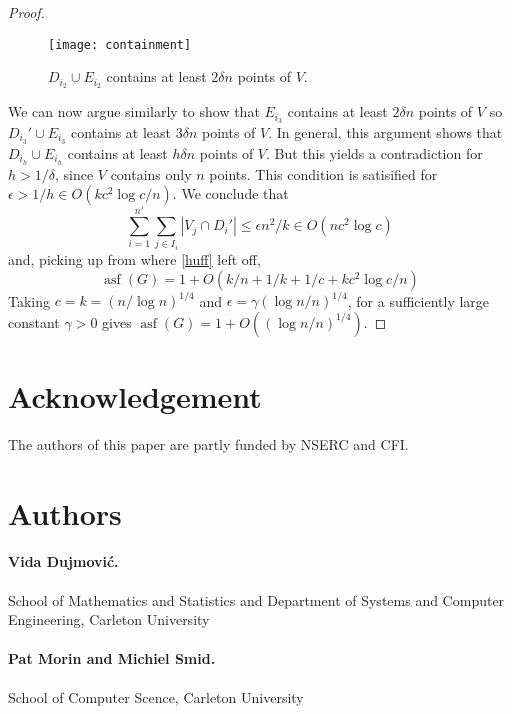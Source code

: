 \documentclass{patmorin}
\DeclareMathOperator{\asf}{asf}
\begin{document}
\begin{proof}
  \begin{figure}
     \begin{center}
       \texttt{[image: containment]}
     \end{center}
     \caption{$D_{i_2}\cup E_{i_2}$ contains at least $2\delta n$ 
              points of $V$.}
   \end{figure}

  We can now argue similarly to show that $E_{i_3}$ contains at least
  $2\delta n$ points of $V$ so $D_{i_3}'\cup E_{i_3}$ contains at least
  $3\delta n$ points of $V$.  In general, this argument shows that
  $D_{i_h}\cup E_{i_h}$ contains at least $h\delta n$ points of $V$.
  But this yields a contradiction for $h> 1/\delta$, since $V$
  contains only $n$ points.  This condition is satisified for $\epsilon > 1/h \in O(kc^2\log c/n)$. We conclude that 
  \[
    \sum_{i=1}^{n'}\sum_{j\in I_i} |V_j\cap D_i'| 
       \le \epsilon n^2/k  \in O(nc^2\log c)
  \]
  and, picking up from where \eqref{huff} left off, 
  \[
     \asf(G) = 1 + O(k/n + 1/k + 1/c + kc^2\log c/n)
  \]
  Taking $c=k=(n/\log n)^{1/4}$ and $\epsilon = \gamma (\log n/n)^{1/4}$,
  for a sufficiently large constant $\gamma >0$ gives $\asf(G)=1+O((\log
  n/n)^{1/4})$.
\end{proof}



\section*{Acknowledgement}

The authors of this paper are partly funded by NSERC and CFI.

\section*{Authors}

\paragraph{Vida Dujmovi\'c.}
School of Mathematics and Statistics and Department of Systems and Computer Engineering, Carleton University

\paragraph{Pat Morin and Michiel Smid.}
School of Computer Scence, Carleton University




\end{document}
